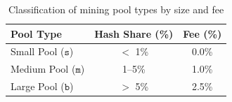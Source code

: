 \documentclass[12pt]{article}
\begin{document}
\begin{table}[ht]
	\centering
	\begin{tabular}{|l|c|c|}
		\hline
		\textbf{Pool Type} & \textbf{Hash Share (\%)} & \textbf{Fee (\%)} \\
		\hline
		Small Pool ($\texttt{s}$)   & $<$ 1\%      & 0.0\% \\
		Medium Pool ($\texttt{m}$)  & 1–5\%        & 1.0\% \\
		Large Pool   ($\texttt{b}$) & $>$ 5\%      & 2.5\% \\
		\hline
	\end{tabular}
	\caption{Classification of mining pool types by size and fee}
	\label{tab:pool-types}
\end{table}
%
\end{document}
